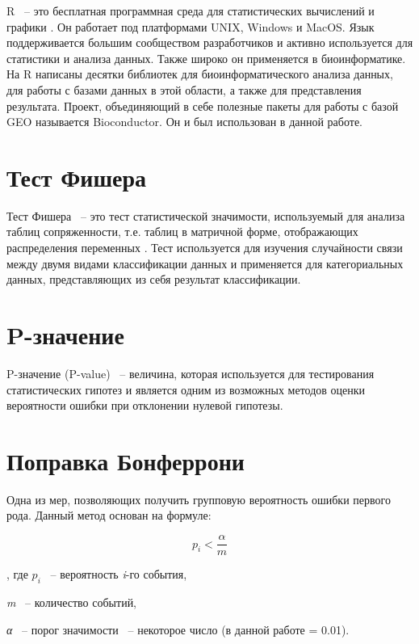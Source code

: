 \documentclass[times,specification,annotation]{itmo-student-thesis}
\begin{document}
R ~-- это бесплатная программная среда для статистических вычислений и графики \cite{R}. Он работает под платформами UNIX, Windows и MacOS. Язык поддерживается большим сообществом разработчиков и активно используется для статистики и анализа данных. Также широко он применяется в биоинформатике. На R написаны десятки библиотек для биоинформатического анализа данных, для работы с базами данных в этой области, а также для представления результата. Проект, объединяющий в себе полезные пакеты для работы с базой GEO называется Bioconductor. Он и был использован в данной работе.

\section{Тест Фишера}

Тест Фишера ~-- это тест статистической значимости, используемый для анализа таблиц сопряженности, т.е. таблиц в матричной форме, отображающих распределения переменных \cite{Fisher}. Тест используется для изучения случайности связи между двумя видами классификации данных и применяется для категориальных данных, представляющих из себя результат классификации.

\section{P-значение}

P-значение (P-value) ~-- величина, которая используется для тестирования статистических гипотез и является одним из возможных методов оценки вероятности ошибки при отклонении нулевой гипотезы.

\section{Поправка Бонферрони}

Одна из мер, позволяющих получить групповую вероятность ошибки первого рода. Данный метод основан на формуле: 

\begin{equation}
\label{bonferroni}
    p_{i} < \frac{\alpha }{m}
\end{equation}

, где \begin{math}p_i\end{math} ~-- вероятность \textit{i}-го события, 

\textit{m} ~-- количество событий,

\textit{α} ~-- порог значимости ~-- некоторое число (в данной работе = 0.01).
\end{document}
